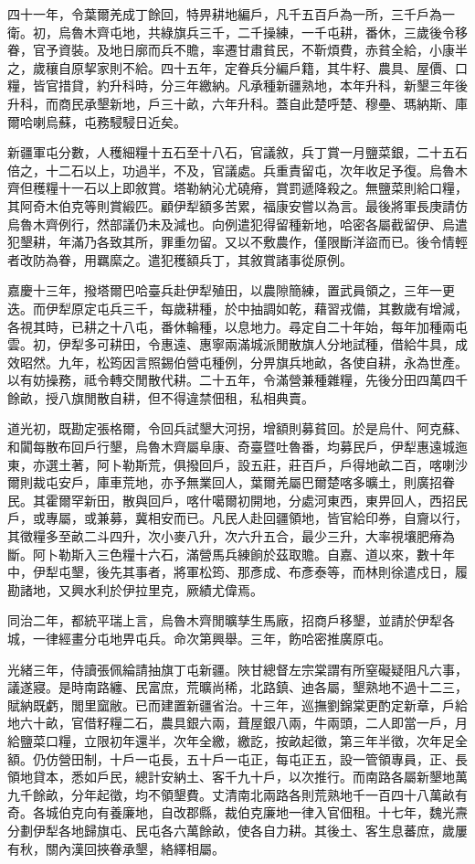 \begin{pinyinscope}
四十一年，令葉爾羌成丁餘回，特畀耕地編戶，凡千五百戶為一所，三千戶為一衛。初，烏魯木齊屯地，共綠旗兵三千，二千操練，一千屯耕，番休，三歲後令移眷，官予資裝。及地日廓而兵不贍，率遷甘肅貧民，不靳煩費，赤貧全給，小康半之，歲穰自原挈家則不給。四十五年，定眷兵分編戶籍，其牛籽、農具、屋價、口糧，皆官措貸，約升科時，分三年繳納。凡承種新疆熟地，本年升科，新墾三年後升科，而商民承墾新地，戶三十畝，六年升科。蓋自此楚呼楚、穆壘、瑪納斯、庫爾哈喇烏蘇，屯務駸駸日近矣。

新疆軍屯分數，人穫細糧十五石至十八石，官議敘，兵丁賞一月鹽菜銀，二十五石倍之，十二石以上，功過半，不及，官議處。兵重責留屯，次年收足予復。烏魯木齊但穫糧十一石以上即敘賞。塔勒納沁尤磽瘠，賞罰遞降殺之。無鹽菜則給口糧，其阿奇木伯克等則賞緞匹。顧伊犁額多苦累，福康安嘗以為言。最後將軍長庚請仿烏魯木齊例行，然部議仍未及減也。向例遣犯得留種新地，哈密各屬截留伊、烏遣犯墾耕，年滿乃各致其所，罪重勿留。又以不敷農作，僅限斷洋盜而已。後令情輕者改防為眷，用羈縻之。遣犯穫額兵丁，其敘賞諸事從原例。

嘉慶十三年，撥塔爾巴哈臺兵赴伊犁殖田，以農隙簡練，置武員領之，三年一更迭。而伊犁原定屯兵三千，每歲耕種，於中抽調如乾，藉習戎備，其數歲有增減，各視其時，已耕之十八屯，番休輪種，以息地力。尋定自二十年始，每年加種兩屯雲。初，伊犁多可耕田，令惠遠、惠寧兩滿城派閒散旗人分地試種，借給牛具，成效昭然。九年，松筠因言照錫伯營屯種例，分畀旗兵地畝，各使自耕，永為世產。以有妨操務，祗令轉交閒散代耕。二十五年，令滿營兼種雜糧，先後分田四萬四千餘畝，授八旗閒散自耕，但不得違禁佃租，私相典賣。

道光初，既勘定張格爾，令回兵試墾大河拐，增額則募貧回。於是烏什、阿克蘇、和闐每散布回戶行墾，烏魯木齊屬阜康、奇臺暨吐魯番，均募民戶，伊犁惠遠城迤東，亦選土著，阿卜勒斯荒，俱撥回戶，設五莊，莊百戶，戶得地畝二百，喀喇沙爾則裁屯安戶，庫車荒地，亦予無業回人，葉爾羌屬巴爾楚喀多曠土，則廣招眷民。其霍爾罕新田，散與回戶，喀什噶爾初開地，分處河東西，東畀回人，西招民戶，或專屬，或兼募，冀相安而已。凡民人赴回疆領地，皆官給印券，自齎以行，其徵糧多至畝二斗四升，次小麥八升，次六升五合，最少三升，大率視壤肥瘠為斷。阿卜勒斯入三色糧十六石，滿營馬兵練餉於茲取贍。自嘉、道以來，數十年中，伊犁屯墾，後先其事者，將軍松筠、那彥成、布彥泰等，而林則徐遣戍日，履勘諸地，又興水利於伊拉里克，厥績尤偉焉。

同治二年，都統平瑞上言，烏魯木齊閒曠孳生馬廠，招商戶移墾，並請於伊犁各城，一律經畫分屯地畀屯兵。命次第興舉。三年，飭哈密推廣原屯。

光緒三年，侍讀張佩綸請抽旗丁屯新疆。陜甘總督左宗棠謂有所窒礙疑阻凡六事，議遂寢。是時南路纏、民富庶，荒曠尚稀，北路鎮、迪各屬，墾熟地不過十二三，賦納既虧，閭里窳敝。已而建置新疆省治。十三年，巡撫劉錦棠更酌定新章，戶給地六十畝，官借籽糧二石，農具銀六兩，葺屋銀八兩，牛兩頭，二人即當一戶，月給鹽菜口糧，立限初年還半，次年全繳，繳訖，按畝起徵，第三年半徵，次年足全額。仍仿營田制，十戶一屯長，五十戶一屯正，每屯正五，設一管領專員，正、長領地貸本，悉如戶民，總計安納土、客千九十戶，以次推行。而南路各屬新墾地萬九千餘畝，分年起徵，均不領墾費。丈清南北兩路各則荒熟地千一百四十八萬畝有奇。各城伯克向有養廉地，自改郡縣，裁伯克廉地一律入官佃租。十七年，魏光燾分劃伊犁各地歸旗屯、民屯各六萬餘畝，使各自力耕。其後土、客生息蕃庶，歲屢有秋，關內漢回挾眷承墾，絡繹相屬。


\end{pinyinscope}
